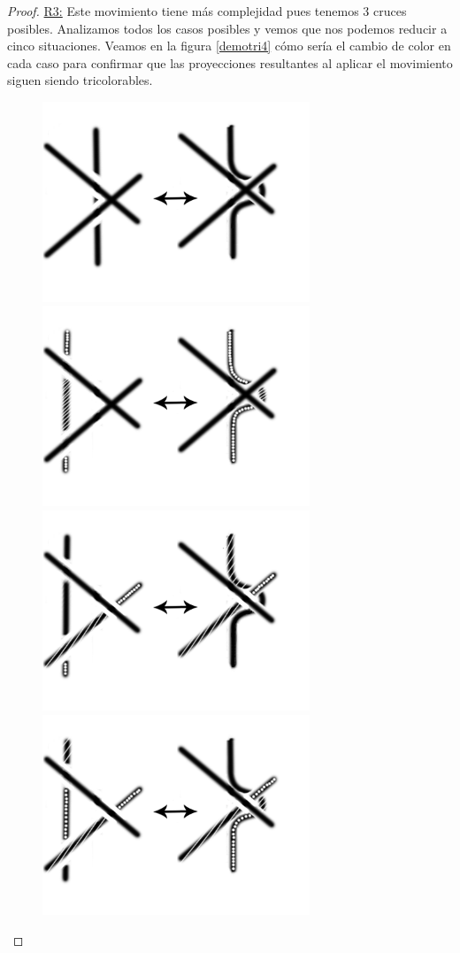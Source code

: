 \documentclass[14pt]{extarticle}
\begin{document}
\begin{teo}
\begin{proof}
		\underline{R3:}
	Este movimiento tiene más complejidad pues tenemos 3 cruces posibles. Analizamos todos los casos posibles y vemos que nos podemos reducir a cinco situaciones. Veamos en la figura \ref{demotri4} cómo sería el cambio de color en cada caso para confirmar que las proyecciones resultantes al aplicar el movimiento siguen siendo tricolorables. \\
		\begin{figure}[h!]
			\centering
			\includegraphics[width=8cm]{inudos/movi5.png}
			\includegraphics[width=8cm]{inudos/movi5tri1.png}
			\includegraphics[width=8cm]{inudos/movi5tri2.png}
			\includegraphics[width=8cm]{inudos/movi5tri3.png}

\end{figure}
\end{proof}
\end{teo}
\end{document}
